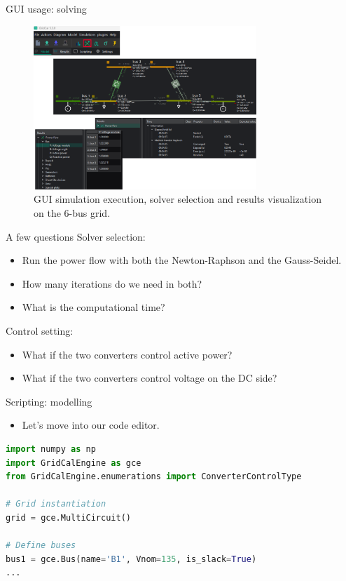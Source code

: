 \begin{frame}{GUI usage: solving}
    \begin{figure}[H]
        \centering
    \includegraphics[width=0.75\textwidth]{Images/6busgui2.png}
    \caption{GUI simulation execution, solver selection and results visualization on the 6-bus grid.}
    \label{fig:6bus2}
    \end{figure}
\end{frame}

\begin{frame}{A few questions}
    Solver selection:
    \begin{itemize}
        \item Run the power flow with both the Newton-Raphson and the Gauss-Seidel.
        \item How many iterations do we need in both?
        \item What is the computational time?
    \end{itemize}
    Control setting:
    \begin{itemize}
        \item What if the two converters control active power?
        \item What if the two converters control voltage on the DC side?
    \end{itemize}
\end{frame}

\begin{frame}[fragile]{Scripting: modelling}
   \begin{itemize}
    \item Let's move into our code editor.
   \end{itemize}

    \begin{lstlisting}[language=Python]
import numpy as np
import GridCalEngine as gce
from GridCalEngine.enumerations import ConverterControlType

# Grid instantiation
grid = gce.MultiCircuit()

# Define buses
bus1 = gce.Bus(name='B1', Vnom=135, is_slack=True)
...
    \end{lstlisting}
\end{frame}

